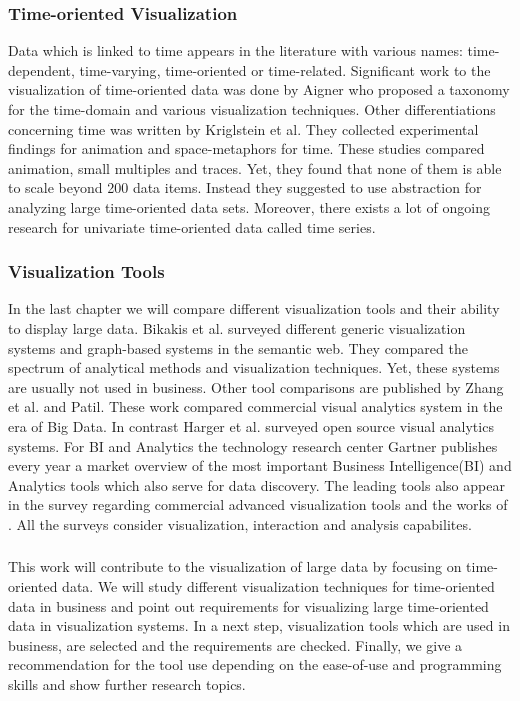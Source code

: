 \subsubsection*{Time-oriented Visualization}
Data which is linked to time appears in the literature with various names: time-dependent\cite{Postfach2003, Tominski2005,Kriglstein2014,Aigner2007,VanBuuren2001,FerreiradeOliveira2003,Yang2003,Chung2014,Rind2011}, time-varying\cite{Moere2004}, time-oriented\cite{Aigner2008,Aigner2007,Aigner2011,Hinum2005,Walker} or time-related\cite{Keimc}. Significant work to the visualization of time-oriented data was done by Aigner\cite{Aigner2011,Aigner2008,Aigner2007} who proposed a taxonomy for the time-domain and various visualization techniques. Other differentiations concerning time was written by Kriglstein et al\cite{Kriglstein2014}. They collected experimental findings for animation and space-metaphors for time. These studies compared animation, small multiples and traces. Yet, they found that none of them is able to scale beyond 200 data items\cite{Robertson2013}. Instead they suggested to use abstraction for analyzing large time-oriented data sets. Moreover, there exists a lot of ongoing research for univariate time-oriented data called time series\cite{Aigner2011, Buono, Walker,Leonard,Chen1993,Esling2012}.

\subsubsection*{Visualization Tools}
In the last chapter we will compare different visualization tools and their ability to display large data. Bikakis et al. surveyed different generic visualization systems and graph-based systems in the semantic web\cite{Bikakis2016}. They compared the spectrum of analytical methods and visualization techniques. Yet, these systems are usually not used in business. 
Other tool comparisons are published by Zhang et al.\cite{Zhanga} and Patil\cite{Patil}. These work compared commercial visual analytics system in the era of Big Data. In contrast Harger et al. surveyed open source visual analytics systems\cite{Harger}. For BI and Analytics the technology research center Gartner publishes every year a market overview of the most important Business Intelligence(BI) and Analytics tools which also serve for data discovery. The leading tools also appear in the survey\cite{Evelson2012} regarding commercial advanced visualization tools and the works of \cite{Zhanga}. All the surveys consider visualization, interaction and analysis capabilites.  

\subsubsection*{}
This work will contribute to the visualization of large data by focusing on time-oriented data. We will study different visualization techniques for time-oriented data in business and point out requirements for visualizing large time-oriented data in visualization systems. In a next step, visualization tools which are used in business, are selected and the requirements are checked. Finally, we give a recommendation for the tool use depending on the ease-of-use and programming skills and show further research topics.